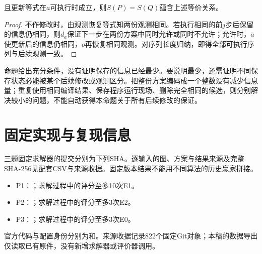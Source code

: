 \documentclass[anonymous,notoc]{gmcm2026}
\begin{document}
且更新等式在\(a\)可执行时成立，则\(S(P)=S(Q)\)蕴含上述等价关系。

\begin{proof} 不作修改时，由观测恢复等式知两份观测相同。若执行相同的前\(j\)步后保留的信息仍相同，则\(d_a\)保证下一步在两份方案中同时允许或同时不允许；允许时，\(\bar a\)使更新后的信息仍相同，\(o\)再恢复相同观测。对序列长度归纳，即得全部可执行序列与后续观测一致。\end{proof}

命题给出充分条件，没有证明保存的信息已经最少。要说明最少，还需证明不同保存状态必能被某个后续修改或观测区分。把整份方案编码成一个整数没有减少信息量；重复使用相同编译结果、保存程序运行现场、删除完全相同的候选，则分别解决较小的问题，不能自动获得本命题关于所有后续修改的保证。

\section{固定实现与复现信息}
三题固定求解器的提交分别为下列SHA。逐输入的图、方案与结果来源及完整SHA-256见配套CSV与来源收据。固定版本结果不能用不同算法的历史赢家拼接。
\begin{itemize}
\item P1：\texttt{}；求解过程中的评分至多10次E1。
\item P2：\texttt{}；求解过程中的评分至多3次E2。
\item P3：\texttt{}；求解过程中的评分至多3次E0。
\end{itemize}
官方代码与配置身份分别为\texttt{}和\texttt{}。来源收据记录822个固定Git对象；本稿的数据导出仅读取已有原件，没有新增求解器或评价器调用。
\end{document}
